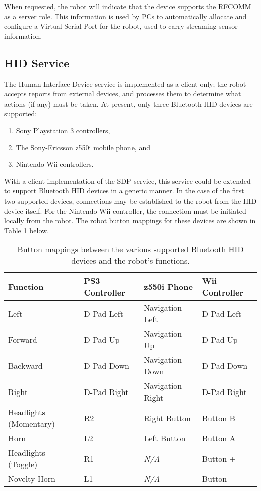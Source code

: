 When requested, the robot will indicate that the device supports the RFCOMM as a server role. This information is used by PCs to automatically allocate and configure a Virtual Serial Port for the robot, used to carry streaming sensor information.

\subsection{HID Service}

The Human Interface Device service is implemented as a client only; the robot accepts reports from external devices, and processes them to determine what actions (if any) must be taken. At present, only three Bluetooth HID devices are supported:

\begin{enumerate}
	\item Sony Playstation 3 controllers,
	\item The Sony-Ericsson z550i mobile phone, and
	\item Nintendo Wii controllers.
\end{enumerate}

With a client implementation of the SDP service, this service could be extended to support Bluetooth HID devices in a generic manner. In the case of the first two supported devices, connections may be established to the robot from the HID device itself. For the Nintendo Wii controller, the connection must be initiated locally from the robot. The robot button mappings for these devices are shown in Table \ref{tab:robotbtbuttonmappings} below.

\begin{table}[H]
	\begin{center}
		\begin{tabular}{ | l | l | l | l | }
			\hline
			\textbf{Function}		& \textbf{PS3 Controller}	& \textbf{z550i Phone}	& \textbf{Wii Controller} \\ \hline

			Left					& D-Pad Left				& Navigation Left		& D-Pad Left	\\ \hline
			Forward					& D-Pad Up					& Navigation Up			& D-Pad Up		\\ \hline
			Backward				& D-Pad Down				& Navigation Down		& D-Pad Down	\\ \hline
			Right					& D-Pad Right				& Navigation Right		& D-Pad Right	\\ \hline
			Headlights (Momentary)	& R2						& Right Button			& Button B		\\ \hline
			Horn					& L2						& Left Button			& Button A		\\ \hline
			Headlights (Toggle)		& R1						& \textit{N/A}			& Button +		\\ \hline
			Novelty Horn			& L1						& \textit{N/A}			& Button -		\\ \hline
		\end{tabular}
		\caption[Bluetooth HID robot button mappings]{Button mappings between the various supported Bluetooth HID devices and the robot's functions.}
		\label{tab:robotbtbuttonmappings}
	\end{center}
\end{table}


